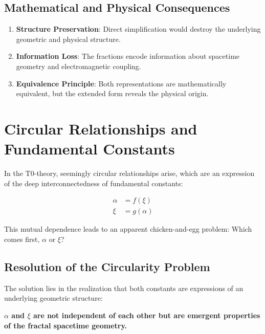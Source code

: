 	\subsection*{Mathematical and Physical Consequences}
	
	\begin{enumerate}
		\item \textbf{Structure Preservation}: Direct simplification would destroy the underlying geometric and physical structure.
		
		\item \textbf{Information Loss}: The fractions encode information about spacetime geometry and electromagnetic coupling.
		
		\item \textbf{Equivalence Principle}: Both representations are mathematically equivalent, but the extended form reveals the physical origin.
	\end{enumerate}
	
	\section{Circular Relationships and Fundamental Constants}
	\label{sec:circular}
	
	In the T0-theory, seemingly circular relationships arise, which are an expression of the deep interconnectedness of fundamental constants:
	
	\begin{align*}
		\alpha &= f(\xi) \\
		\xi &= g(\alpha)
	\end{align*}
	
	This mutual dependence leads to an apparent chicken-and-egg problem: Which comes first, \(\alpha\) or \(\xi\)?
	
	\subsection{Resolution of the Circularity Problem}
	
	The solution lies in the realization that both constants are expressions of an underlying geometric structure:
	
	\begin{tcolorbox}[colback=green!5!white,colframe=green!75!black]
		\textbf{\(\alpha\) and \(\xi\) are not independent of each other but are emergent properties of the fractal spacetime geometry.}
	\end{tcolorbox}
	

